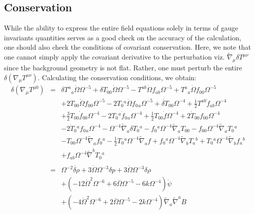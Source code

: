 \subsection{Conservation}
While the ability to express the entire field equations solely in terms of gauge invariants quantities serves as a good check on the accuracy of the calculation, one should also check the conditions of covariant conservation. Here, we note that one cannot simply apply the covariant derivative to the perturbation viz. $\tilde\nabla_\mu \delta T^{\mu\nu}$ since the background geometry is not flat. Rather, one must perturb the entire $\delta (\nabla_\mu T^{\mu\nu})$. Calculating the conservation conditions, we obtain:
\begin{eqnarray}
\delta(\nabla_\mu T^{\mu 0})&=& \delta T^{a}{}_{a} \dot{\Omega} \Omega^{-5} + \delta T_{00}{} \dot{\Omega} \Omega^{-5} -  T^{ab} \dot{\Omega} f_{ab} \Omega^{-5} + T^{a}{}_{a} \dot{\Omega} f_{00}{} \Omega^{-5} 
\nonumber\\
&&+ 2 T_{00}{} \dot{\Omega} f_{00}{} \Omega^{-5} - 2 T_{0}{}^{a} \dot{\Omega} f_{0}{}_{a} \Omega^{-5}  + \dot{\delta T}_{00}{} \Omega^{-4} + \tfrac{1}{2} T^{ab} \dot{f}_{ab} \Omega^{-4} 
\nonumber\\
&&+ \tfrac{3}{2} T_{00}{} \dot{f}_{00}{} \Omega^{-4} - 2 T_{0}{}^{a} \dot{f}_{0}{}_{a} \Omega^{-4} + \tfrac{1}{2} T_{00}{} \dot{f} \Omega^{-4} + 2 \dot{T}_{00}{} f_{00}{} \Omega^{-4} \nonumber \\ 
&& - 2 \dot{T}_{0}{}^{a} f_{0}{}_{a} \Omega^{-4} -  \Omega^{-4} \tilde{\nabla}_{a}\delta T_{0}{}^{a} -  f_{0}{}^{a} \Omega^{-4} \tilde{\nabla}_{a}T_{00}{} -  f_{00}{} \Omega^{-4} \tilde{\nabla}_{a}T_{0}{}^{a}
\nonumber\\
&& -  T_{00}{} \Omega^{-4} \tilde{\nabla}_{a}f_{0}{}^{a}  -  \tfrac{1}{2} T_{0}{}^{a} \Omega^{-4} \tilde{\nabla}_{a}f + f_{0}{}^{a} \Omega^{-4} \tilde{\nabla}_{b}T_{a}{}^{b} + T_{0}{}^{a} \Omega^{-4} \tilde{\nabla}_{b}f_{a}{}^{b} 
\nonumber\\
&&+ f_{ab} \Omega^{-4} \tilde{\nabla}^{b}T_{0}{}^{a}
\\ \nonumber\\
&=& \Omega^{-2} \dot{\delta \rho} + 3 \dot{\Omega} \Omega^{-3} \delta p + 3 \dot{\Omega} \Omega^{-3} \delta \rho 
\nonumber\\
&&+ (-12 \dot{\Omega}^2 \Omega^{-6} + 6 \overset{..}{\Omega} \Omega^{-5} - 6 k \Omega^{-4}) \dot{\psi} \nonumber \\ 
&& + (-4 \dot{\Omega}^2 \Omega^{-6} + 2 \overset{..}{\Omega} \Omega^{-5} - 2 k \Omega^{-4}) \tilde{\nabla}_{a}\tilde{\nabla}^{a}B 

\end{eqnarray}
